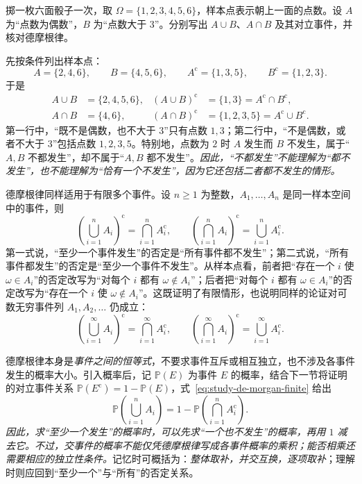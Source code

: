 \begin{example}
\label{ex:study-de-morgan-die}
掷一枚六面骰子一次，取 $\Omega=\{1,2,3,4,5,6\}$，样本点表示朝上一面的点数。设 $A$ 为“点数为偶数”，$B$ 为“点数大于 $3$”。分别写出 $A\cup B$、$A\cap B$ 及其对立事件，并核对德摩根律。
\end{example}

\begin{solve}
先按条件列出样本点：
\[
  A=\{2,4,6\},\qquad B=\{4,5,6\},\qquad
  A^{\mathrm c}=\{1,3,5\},\qquad B^{\mathrm c}=\{1,2,3\}.
\]
于是
\[
  \begin{aligned}
    A\cup B&=\{2,4,5,6\},&
    (A\cup B)^{\mathrm c}&=\{1,3\}
      =A^{\mathrm c}\cap B^{\mathrm c},\\
    A\cap B&=\{4,6\},&
    (A\cap B)^{\mathrm c}&=\{1,2,3,5\}
      =A^{\mathrm c}\cup B^{\mathrm c}.
  \end{aligned}
\]
第一行中，“既不是偶数，也不大于 $3$”只有点数 $1,3$；第二行中，“不是偶数，或者不大于 $3$”包括点数 $1,2,3,5$。特别地，点数为 $2$ 时 $A$ 发生而 $B$ 不发生，属于“$A,B$ 不都发生”，却不属于“$A,B$ 都不发生”。\emph{因此，“不都发生”不能理解为“都不发生”，也不能理解为“恰有一个不发生”，因为它还包括二者都不发生的情形。}
\end{solve}

德摩根律同样适用于有限多个事件。设 $n\ge1$ 为整数，$A_1,\ldots,A_n$ 是同一样本空间中的事件，则
\begin{equation}
  \left(\bigcup_{i=1}^{n}A_i\right)^{\mathrm c}
    =\bigcap_{i=1}^{n}A_i^{\mathrm c},
  \qquad
  \left(\bigcap_{i=1}^{n}A_i\right)^{\mathrm c}
    =\bigcup_{i=1}^{n}A_i^{\mathrm c}.
  \label{eq:study-de-morgan-finite}
\end{equation}
第一式说，“至少一个事件发生”的否定是“所有事件都不发生”；第二式说，“所有事件都发生”的否定是“至少一个事件不发生”。从样本点看，前者把“存在一个 $i$ 使 $\omega\in A_i$”的否定改写为“对每个 $i$ 都有 $\omega\notin A_i$”；后者把“对每个 $i$ 都有 $\omega\in A_i$”的否定改写为“存在一个 $i$ 使 $\omega\notin A_i$”。这既证明了有限情形，也说明同样的论证对可数无穷事件列 $A_1,A_2,\ldots$ 仍成立：
\begin{equation}
  \left(\bigcup_{i=1}^{\infty}A_i\right)^{\mathrm c}
    =\bigcap_{i=1}^{\infty}A_i^{\mathrm c},
  \qquad
  \left(\bigcap_{i=1}^{\infty}A_i\right)^{\mathrm c}
    =\bigcup_{i=1}^{\infty}A_i^{\mathrm c}.
  \label{eq:study-de-morgan-countable}
\end{equation}

德摩根律本身是\emph{事件之间的恒等式}，不要求事件互斥或相互独立，也不涉及各事件发生的概率大小。引入概率后，记 $\mathbb P(E)$ 为事件 $E$ 的概率，结合下一节将证明的对立事件关系 $\mathbb P(E^{\mathrm c})=1-\mathbb P(E)$，式~\eqref{eq:study-de-morgan-finite} 给出
\begin{equation}
  \mathbb P\!\left(\bigcup_{i=1}^{n}A_i\right)
    =1-\mathbb P\!\left(\bigcap_{i=1}^{n}A_i^{\mathrm c}\right).
  \label{eq:study-de-morgan-probability}
\end{equation}
\emph{因此，求“至少一个发生”的概率时，可以先求“一个也不发生”的概率，再用 $1$ 减去它。}\emph{不过，交事件的概率不能仅凭德摩根律写成各事件概率的乘积；能否相乘还需要相应的独立性条件。}记忆时可概括为：\emph{整体取补，并交互换，逐项取补}；理解时则应回到“至少一个”与“所有”的否定关系。

